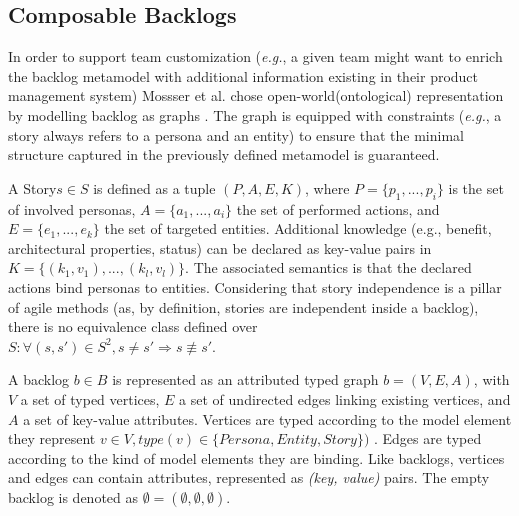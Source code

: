 \subsection*{Composable Backlogs}
In order to support team customization (\emph{e.g.}, a given team might want to enrich the backlog metamodel with additional information existing in their product management system) Mossser et al. chose open-world(ontological) representation by modelling backlog as graphs \cite{mosser2022modelling}. The graph is equipped with constraints (\emph{e.g.}, a story always refers to a persona and an entity) to ensure that the minimal structure captured in the previously deﬁned metamodel is guaranteed.
\begin{definition}
A Story$s \in S$ is defined as a tuple $\left(P,A,E,K\right)$, where $P=\{p_1, ..., p_i\}$ is the set of involved personas, $A= \{a_1, ..., a_i\}$ the set of performed actions, and $E = \{e_1, ..., e_k\}$ the set of targeted entities. Additional knowledge (e.g., benefit, architectural properties, status) can be declared as key-value pairs in $K = \{(k_1,v_1), ..., (k_l,v_l)\}$. The associated semantics is that the declared actions bind personas to entities. Considering that story independence is a pillar of agile methods (as, by definition, stories are independent inside a backlog), there is no equivalence class deﬁned over \\
$S: \forall (s,s')\in S^2, s\neq s' \Rightarrow s \not \equiv s'$.
\end{definition}
\begin{definition}
A backlog $b \in B$ is represented as an attributed typed graph $b = (V, E, A)$, with $V$ a set of typed vertices, $E$ a set of undirected edges linking existing vertices, and $A$ a set of key-value attributes. Vertices are typed according to the model element they represent $v \in V, type(v) \in \{ Persona, Entity, Story \} )$ . Edges are typed according to the kind of model elements they are binding. Like backlogs, vertices and edges can contain attributes, represented as \emph{(key, value)} pairs. The empty backlog is denoted as $\emptyset = (\emptyset ,\emptyset ,\emptyset )$.
\end{definition}
